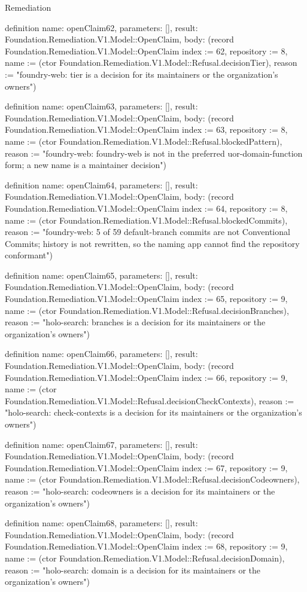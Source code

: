 \begin{lexlean}{Remediation}
\begin{semanticmodule}
definition{
  name: openClaim62,
  parameters: [],
  result: Foundation.Remediation.V1.Model::OpenClaim,
  body: (record Foundation.Remediation.V1.Model::OpenClaim {index := 62, repository := 8, name := (ctor Foundation.Remediation.V1.Model::Refusal.decisionTier), reason := "foundry-web: tier is a decision for its maintainers or the organization's owners"})
}

definition{
  name: openClaim63,
  parameters: [],
  result: Foundation.Remediation.V1.Model::OpenClaim,
  body: (record Foundation.Remediation.V1.Model::OpenClaim {index := 63, repository := 8, name := (ctor Foundation.Remediation.V1.Model::Refusal.blockedPattern), reason := "foundry-web: foundry-web is not in the preferred uor-{domain}-{function} form; a new name is a maintainer decision"})
}

definition{
  name: openClaim64,
  parameters: [],
  result: Foundation.Remediation.V1.Model::OpenClaim,
  body: (record Foundation.Remediation.V1.Model::OpenClaim {index := 64, repository := 8, name := (ctor Foundation.Remediation.V1.Model::Refusal.blockedCommits), reason := "foundry-web: 5 of 59 default-branch commits are not Conventional Commits; history is not rewritten, so the naming app cannot find the repository conformant"})
}

definition{
  name: openClaim65,
  parameters: [],
  result: Foundation.Remediation.V1.Model::OpenClaim,
  body: (record Foundation.Remediation.V1.Model::OpenClaim {index := 65, repository := 9, name := (ctor Foundation.Remediation.V1.Model::Refusal.decisionBranches), reason := "holo-search: branches is a decision for its maintainers or the organization's owners"})
}

definition{
  name: openClaim66,
  parameters: [],
  result: Foundation.Remediation.V1.Model::OpenClaim,
  body: (record Foundation.Remediation.V1.Model::OpenClaim {index := 66, repository := 9, name := (ctor Foundation.Remediation.V1.Model::Refusal.decisionCheckContexts), reason := "holo-search: check-contexts is a decision for its maintainers or the organization's owners"})
}

definition{
  name: openClaim67,
  parameters: [],
  result: Foundation.Remediation.V1.Model::OpenClaim,
  body: (record Foundation.Remediation.V1.Model::OpenClaim {index := 67, repository := 9, name := (ctor Foundation.Remediation.V1.Model::Refusal.decisionCodeowners), reason := "holo-search: codeowners is a decision for its maintainers or the organization's owners"})
}

definition{
  name: openClaim68,
  parameters: [],
  result: Foundation.Remediation.V1.Model::OpenClaim,
  body: (record Foundation.Remediation.V1.Model::OpenClaim {index := 68, repository := 9, name := (ctor Foundation.Remediation.V1.Model::Refusal.decisionDomain), reason := "holo-search: domain is a decision for its maintainers or the organization's owners"})
}


\end{semanticmodule}
\end{lexlean}
